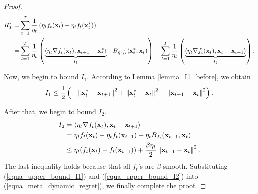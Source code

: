 \documentclass{article}
\begin{document}
\begin{proof}
\begin{align}
\nonumber
 R_T^{\ast}  =& \sum\limits_{t=1}^T \frac{1}{\eta_t} \left( \eta_t f_t({\bf x}_t) -  \eta_t f_t({\bf x}_t^{\ast}) \right) \\ \label{equa_meta_dynamic_regret}
=& \sum_{t=1}^T\frac{1}{\eta_t} \left(  \underbrace{\langle \eta_t\nabla f_t({\bf x}_t), {\bf x}_{t+1}-{\bf x}_t^{\ast}\rangle}_{I_1} -  B_{\eta_t f_t}({\bf x}_t^{\ast}, {\bf x}_t)  \right)  + \sum_{t=1}^T\frac{1}{\eta_t} \left(  \underbrace{\langle \eta_t\nabla f_t({\bf x}_t), {\bf x}_t-{\bf x}_{t+1} \rangle}_{I_2}  \right).
\end{align}

Now, we begin to bound $I_1$. According to Lemma \ref{lemma_I1_before}, we obtain
\begin{align}
\label{equa_upper_bound_I1}
I_1  \le  \frac{1}{2}\left( -  \left\lVert{\bf x}_t^{\ast} - {\bf x}_{t+1}\right\rVert^2   + \left\lVert {\bf x}_t^{\ast} - {\bf x}_t \right\rVert^2 - \left\lVert{\bf x}_{t+1} - {\bf x}_t\right\rVert^2 \right).
\end{align}

After that, we begin to bound  $I_2$. 
\begin{align}
\nonumber
I_2 &= \langle \eta_t\nabla f_t({\bf x}_t), {\bf x}_t-{\bf x}_{t+1} \rangle \\ \nonumber
&= \eta_t f_t({\bf x}_t) - \eta_t f_t({\bf x}_{t+1}) + \eta_t B_{f_t}({\bf x}_{t+1}, {\bf x}_t)  \\  \label{equa_upper_bound_I2}
&\le \eta_t(f_t({\bf x}_t) - f_t({\bf x}_{t+1})) +  \frac{\beta \eta_t}{2}\left\lVert{\bf x}_{t+1} - {\bf x}_t\right\rVert^2.
\end{align} The last inequality holds because that all $f_t$'s are $\beta$ smooth. Substituting  (\ref{equa_upper_bound_I1}) and (\ref{equa_upper_bound_I2}) into (\ref{equa_meta_dynamic_regret}), we  finally complete the proof.
\end{proof}
\end{document}

